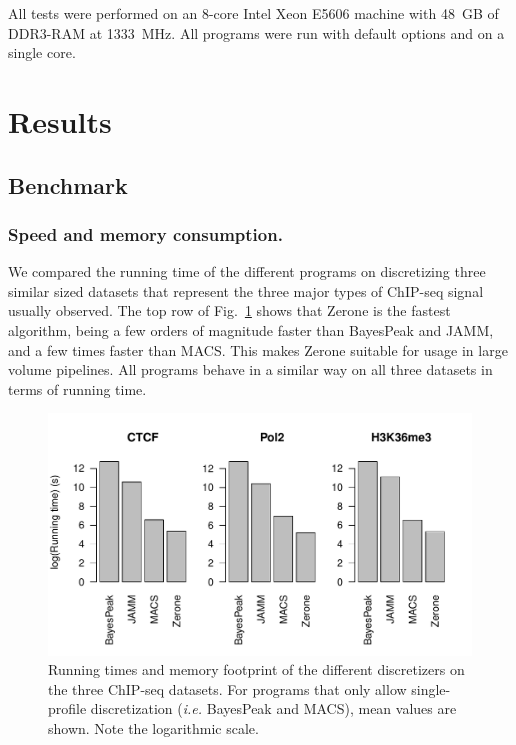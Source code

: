 \documentclass{bioinfo}
\begin{document}
\begin{methods}
All tests were performed on an 8-core Intel Xeon E5606 machine with 48~GB of
DDR3-RAM at 1333~MHz. All programs were run with default options and on a
single core.

\end{methods}

\section{Results}\label{results}


\subsection{Benchmark}
\subsubsection{Speed and memory consumption.}
We compared the running time of the different programs on discretizing three
similar sized datasets that represent the three major types of ChIP-seq signal
usually observed. The top row of Fig.~\ref{fig:times} shows that Zerone is
the fastest algorithm, being a few orders of magnitude faster than BayesPeak
and JAMM, and a few times faster than MACS. This makes Zerone suitable for
usage in large volume pipelines. All programs behave in a similar
way on all three datasets in terms of running time.

\begin{figure}[!tpb]
\centerline{\includegraphics[scale=0.5]{running_times.pdf}}
\caption{Running times and memory footprint of the different discretizers
on the three ChIP-seq datasets.
For programs that only allow single-profile discretization
(\textit{i.e.} BayesPeak and MACS), mean values are shown.
Note the logarithmic scale.
}\label{fig:times}
\end{figure}
\end{document}
